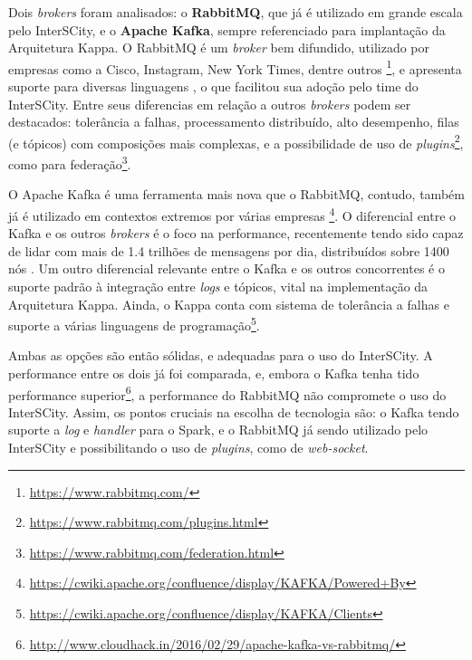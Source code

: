 Dois \textit{brokers} foram analisados: o \textbf{RabbitMQ}, que já é utilizado
em grande escala pelo InterSCity, e o \textbf{Apache Kafka}, sempre
referenciado para implantação da Arquitetura Kappa. O RabbitMQ é um
\textit{broker} bem difundido, utilizado por empresas como a Cisco, Instagram,
New York Times, dentre outros \footnote{\url{https://www.rabbitmq.com/}},
e apresenta suporte para diversas linguagens \cite{zaitsev2014}, o que
facilitou sua adoção pelo time do InterSCity. Entre seus diferencias em relação
a outros \textit{brokers} podem ser destacados: tolerância a falhas,
processamento distribuído, alto desempenho, filas (e tópicos) com composições
mais complexas, e a possibilidade de uso de
\textit{plugins}\footnote{\url{https://www.rabbitmq.com/plugins.html}},
como para federação\footnote{\url{https://www.rabbitmq.com/federation.html}}.

O Apache Kafka é uma ferramenta mais nova que o RabbitMQ, contudo, também já é
utilizado em contextos extremos por várias empresas \footnote{\url{https://cwiki.apache.org/confluence/display/KAFKA/Powered+By}}.
O diferencial entre o Kafka e os outros \textit{brokers} é o foco na
performance, recentemente tendo sido capaz de lidar com mais de 1.4 trilhões de
mensagens por dia, distribuídos sobre 1400 nós \cite{koshy2016}. Um outro
diferencial relevante entre o Kafka e os outros concorrentes é o suporte padrão
à integração entre \textit{logs} e tópicos, vital na implementação da
Arquitetura Kappa. Ainda, o Kappa conta com sistema de tolerância a falhas e
suporte a várias linguagens de
programação\footnote{\url{https://cwiki.apache.org/confluence/display/KAFKA/Clients}}.

Ambas as opções são então sólidas, e adequadas para o uso do InterSCity. A
performance entre os dois já foi comparada, e, embora o Kafka tenha tido
performance
superior\footnote{\url{http://www.cloudhack.in/2016/02/29/apache-kafka-vs-rabbitmq/}},
a performance do RabbitMQ não compromete o uso do InterSCity. Assim, os pontos
cruciais na escolha de tecnologia são: o Kafka tendo suporte a \textit{log} e
\textit{handler} para o Spark, e o RabbitMQ já sendo utilizado pelo InterSCity
e possibilitando o uso de \textit{plugins}, como de \textit{web-socket}.

